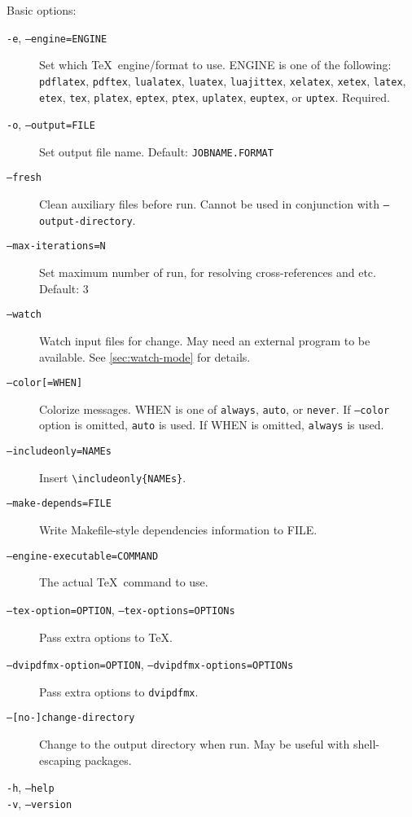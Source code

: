 \documentclass[a4paper]{report}
\newcommand\texcmd[1]{\texttt{\textbackslash #1}}
\newcommand\metavar[1]{\textnormal{\textsf{#1}}}
\begin{document}
Basic options:
\begin{description}
\item[\texttt{-e}, \texttt{--engine=\metavar{ENGINE}}]
  Set which \TeX\ engine/format to use.
  \metavar{ENGINE} is one of the following:
  \texttt{pdflatex}, \texttt{pdftex},
  \texttt{lualatex}, \texttt{luatex}, \texttt{luajittex},
  \texttt{xelatex}, \texttt{xetex},
  \texttt{latex}, \texttt{etex}, \texttt{tex},
  \texttt{platex}, \texttt{eptex}, \texttt{ptex},
  \texttt{uplatex}, \texttt{euptex}, or \texttt{uptex}.
  Required.
\item[\texttt{-o}, \texttt{--output=\metavar{FILE}}]
  Set output file name.
  Default: \texttt{\metavar{JOBNAME}.\metavar{FORMAT}}
\item[\texttt{--fresh}]
  Clean auxiliary files before run.
  Cannot be used in conjunction with \texttt{--output-directory}.
\item[\texttt{--max-iterations=\metavar{N}}]
  Set maximum number of run, for resolving cross-references and etc.
  Default: 3
\item[\texttt{--watch}]
  Watch input files for change.
  May need an external program to be available.
  See \autoref{sec:watch-mode} for details.
\item[\texttt{--color[=\metavar{WHEN}]}]
  Colorize messages.
  \metavar{WHEN} is one of \texttt{always}, \texttt{auto}, or \texttt{never}.
  If \texttt{--color} option is omitted, \texttt{auto} is used.
  If \metavar{WHEN} is omitted, \texttt{always} is used.
\item[\texttt{--includeonly=\metavar{NAMEs}}]
  Insert \texttt{\texcmd{includeonly}\{\metavar{NAMEs}\}}.
\item[\texttt{--make-depends=\metavar{FILE}}]
  Write Makefile-style dependencies information to \metavar{FILE}.
\item[\texttt{--engine-executable=\metavar{COMMAND}}]
  The actual \TeX\ command to use.
\item[\texttt{--tex-option=\metavar{OPTION}}, \texttt{--tex-options=\metavar{OPTIONs}}]
  Pass extra options to \TeX.
\item[\texttt{--dvipdfmx-option=\metavar{OPTION}}, \texttt{--dvipdfmx-options=\metavar{OPTIONs}}]
  Pass extra options to \texttt{dvipdfmx}.
\item[\texttt{--[no-]change-directory}]
  Change to the output directory when run.
  May be useful with shell-escaping packages.
\item[\texttt{-h}, \texttt{--help}]
\item[\texttt{-v}, \texttt{--version}]

\end{description}
\end{document}
